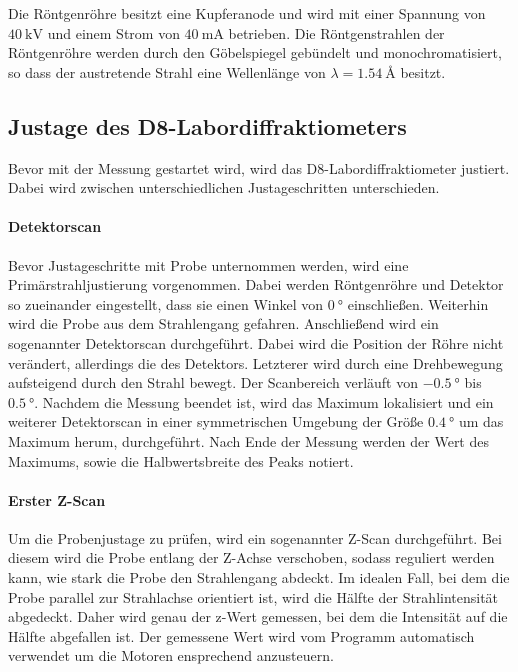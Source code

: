 Die Röntgenröhre besitzt eine Kupferanode und wird mit einer Spannung von $\SI{40}{\kilo\volt}$
und einem Strom von $\SI{40}{\milli\ampere}$ betrieben.
Die Röntgenstrahlen der Röntgenröhre werden durch den Göbelspiegel
gebündelt und monochromatisiert,
so dass der austretende Strahl eine Wellenlänge von
$\lambda=\SI{1.54}{\angstrom}$ besitzt.


\subsection{Justage des D8-Labordiffraktiometers}
\label{subsec:justage}
Bevor mit der Messung gestartet wird, wird das D8-Labordiffraktiometer
justiert. Dabei wird zwischen unterschiedlichen Justageschritten unterschieden.




\paragraph{Detektorscan}
Bevor Justageschritte mit Probe unternommen werden, wird eine Primärstrahljustierung
vorgenommen. Dabei werden Röntgenröhre und Detektor so zueinander eingestellt,
dass sie einen Winkel von $\SI{0}{\degree}$ einschließen. Weiterhin wird die
Probe aus dem Strahlengang gefahren.
Anschließend wird ein sogenannter Detektorscan durchgeführt.
Dabei wird die Position der Röhre nicht verändert, allerdings die des Detektors.
Letzterer wird durch eine Drehbewegung aufsteigend durch den Strahl bewegt. Der Scanbereich
verläuft von $\SI{-0.5}{\degree}$ bis $\SI{0.5}{\degree}$. Nachdem die Messung beendet ist,
wird das Maximum lokalisiert und ein weiterer Detektorscan in einer symmetrischen
Umgebung der Größe $\SI{0.4}{\degree}$ um das Maximum herum, durchgeführt.
Nach Ende der Messung werden der Wert des Maximums, sowie die Halbwertsbreite
des Peaks notiert.

\paragraph{Erster Z-Scan}
Um die Probenjustage zu prüfen,
wird ein sogenannter Z-Scan durchgeführt.
Bei diesem wird die Probe entlang der Z-Achse verschoben,
sodass reguliert werden kann, wie stark die Probe den Strahlengang
abdeckt. Im idealen Fall, bei dem die Probe parallel zur Strahlachse
orientiert ist, wird die Hälfte der Strahlintensität abgedeckt.
Daher wird genau der z-Wert gemessen, bei dem die Intensität auf
die Hälfte abgefallen ist. Der gemessene Wert wird vom Programm automatisch
verwendet um die Motoren ensprechend anzusteuern.


